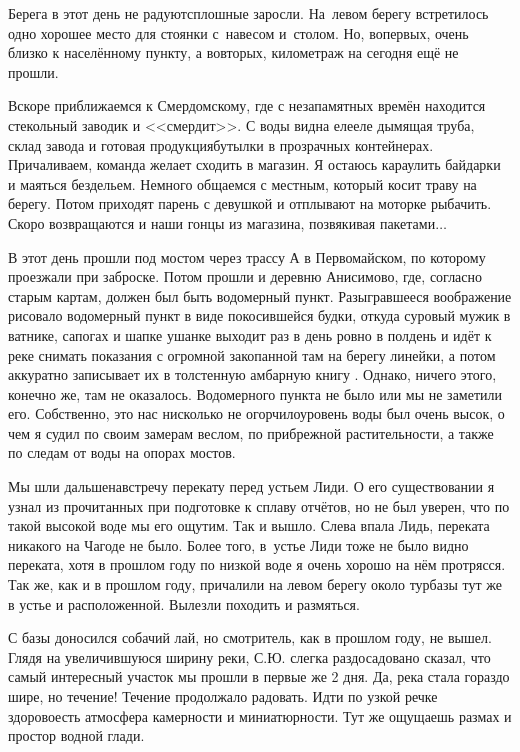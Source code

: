 Берега в этот день не радуют\mdash  сплошные заросли. На~левом берегу встретилось одно хорошее место для стоянки с~навесом и~столом. Но, во\sdash первых, очень близко к населённому пункту, а во\sdash вторых, километраж на сегодня ещё не прошли. 

Вскоре приближаемся к Смердомскому, где с незапамятных времён находится стекольный заводик и <<смердит>>. С воды видна еле\sdash еле дымящая труба, склад завода и готовая продукция\mdash  бутылки в прозрачных контейнерах. Причаливаем, команда желает сходить в магазин. Я остаюсь караулить байдарки и маяться бездельем. Немного общаемся с местным, который косит траву на берегу. Потом приходят парень с девушкой и отплывают на моторке рыбачить. Скоро возвращаются и наши гонцы из магазина, позвякивая пакетами$\ldots$ 

В этот день прошли под мостом через трассу А в Первомайском, по которому проезжали при заброске. Потом прошли и деревню Анисимово, где, согласно старым картам, должен был быть водомерный пункт. Разыгравшееся воображение рисовало водомерный пункт в виде покосившейся будки, откуда суровый мужик в ватнике, сапогах и шапке ушанке выходит раз в день ровно в полдень и идёт к реке снимать показания с огромной закопанной там на берегу линейки, а потом аккуратно записывает их в толстенную амбарную книгу {}. Однако, ничего этого, конечно же, там не оказалось. Водомерного пункта не было или мы не заметили его. Собственно, это нас нисколько не огорчило\mdash уровень воды был очень высок, о чем я судил по своим замерам веслом, по прибрежной растительности, а также по следам от воды на опорах мостов. 

Мы шли дальше\mdash  навстречу перекату перед устьем Лиди. О его существовании я узнал из прочитанных при подготовке к сплаву отчётов, но не был уверен, что по такой высокой воде мы его ощутим. Так и вышло. Слева впала Лидь, переката никакого на Чагоде не было. Более того, в~устье Лиди тоже не было видно переката, хотя в прошлом году по низкой воде я очень хорошо на нём протрясся. Так же, как и в прошлом году, причалили на левом берегу около турбазы тут же в устье и расположенной. Вылезли походить и размяться. 

С базы доносился собачий лай, но смотритель, как в прошлом году, не вышел. Глядя на увеличившуюся ширину реки, С.Ю. слегка раздосадовано сказал, что самый интересный участок мы прошли в первые же 2 дня. Да, река стала гораздо шире, но течение! Течение продолжало радовать. Идти по узкой речке здорово\mdash  есть атмосфера камерности и миниатюрности. Тут же ощущаешь размах и простор водной глади.

